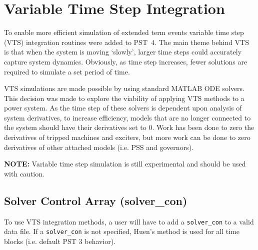 \section{Variable Time Step Integration}  
To enable more efficient simulation of extended term events variable time step (VTS) integration routines were added to \mbox{PST 4}.
The main theme behind VTS is that when the system is moving `slowly', larger time steps could accurately capture system dynamics.
Obviously, as time step increases, fewer solutions are required to simulate a set period of time.


VTS simulations are made possible by using standard MATLAB ODE solvers.
This decision was made to explore the viability of applying VTS methods to a power system.
As the time step of these solvers is dependent upon analysis of system derivatives, to increase efficiency, models that are no longer connected to the system should have their derivatives set to $0$.
Work has been done to zero the derivatives of tripped machines and exciters, but more work can be done to zero derivatives of other attached models (i.e. PSS and governors).


\noindent \textbf{NOTE:} Variable time step simulation is still experimental and should be used with caution.


\subsection{Solver Control Array (solver\_con)}  
To use VTS integration methods, a user will have to add a \verb|solver_con| to a valid data file.
If a \verb|solver_con| is not specified, Huen's method is used for all time blocks (i.e. default PST 3 behavior).

